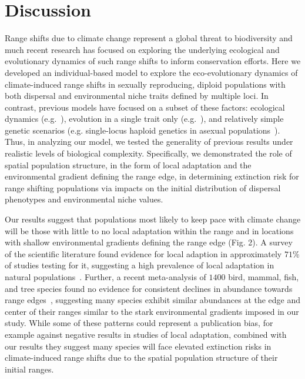 \documentclass[12pt, oneside]{article}
\begin{document}
\section*{Discussion}
Range shifts due to climate change represent a global threat to biodiversity and much recent research has focused on exploring the underlying ecological and evolutionary dynamics of such range shifts to inform conservation efforts. Here we developed an individual-based model to explore the eco-evolutionary dynamics of climate-induced range shifts in sexually reproducing, diploid populations with both dispersal and environmental niche traits defined by multiple loci. In contrast, previous models have focused on a subset of these factors: ecological dynamics (e.g.~\citep{brooker2007modelling}), evolution in a single trait only (e.g.~\citep{atkins2010local, henry2013eco}), and relatively simple genetic scenarios (e.g. single-locus haploid genetics in asexual populations~\citep{boeye2013more, hargreaves2015fitness}). Thus, in analyzing our model, we tested the generality of previous results under realistic levels of biological complexity. Specifically, we demonstrated the role of spatial population structure, in the form of local adaptation and the environmental gradient defining the range edge, in determining extinction risk for range shifting populations via impacts on the initial distribution of dispersal phenotypes and environmental niche values.

Our results suggest that populations most likely to keep pace with climate change will be those with little to no local adaptation within the range and in locations with shallow environmental gradients defining the range edge (Fig. 2). A survey of the scientific literature found evidence for local adaption in approximately $71\%$ of studies testing for it, suggesting a high prevalence of local adaptation in natural populations~\citep{hereford2009quantitative}. Further, a recent meta-analysis of $1400$ bird, mammal, fish, and tree species found no evidence for consistent declines in abundance towards range edges~\citep{dallas2017species}, suggesting many species exhibit similar abundances at the edge and center of their ranges similar to the stark environmental gradients imposed in our study. While some of these patterns could represent a publication bias, for example against negative results in studies of local adaptation, combined with our results they suggest many species will face elevated extinction risks in climate-induced range shifts due to the spatial population structure of their initial ranges.
\end{document}
